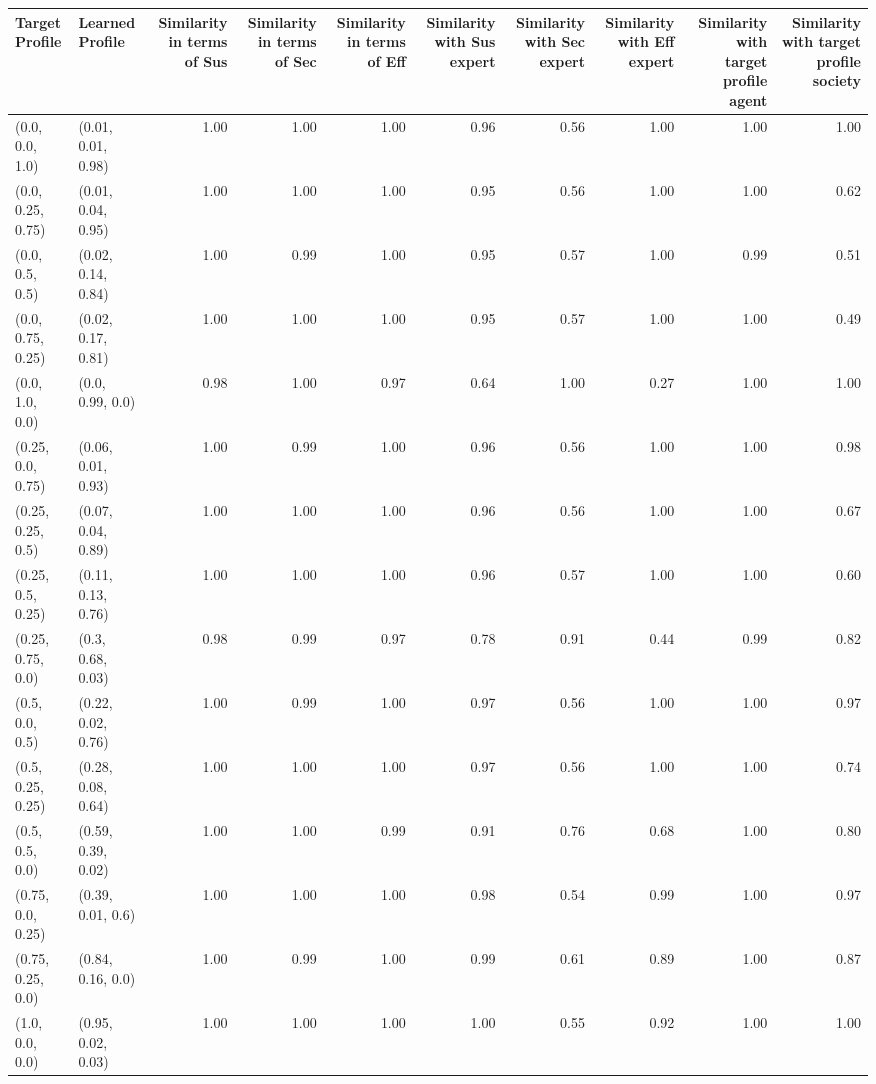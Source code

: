 \begin{tabular}{llrrrrrrrr}
\toprule
Target Profile & Learned Profile & Similarity in terms of Sus & Similarity in terms of Sec & Similarity in terms of Eff & Similarity with Sus expert & Similarity with Sec expert & Similarity with Eff expert & Similarity with target profile agent & Similarity with target profile society \\
\midrule
(0.0, 0.0, 1.0) & (0.01, 0.01, 0.98) & 1.00 & 1.00 & 1.00 & 0.96 & 0.56 & 1.00 & 1.00 & 1.00 \\
(0.0, 0.25, 0.75) & (0.01, 0.04, 0.95) & 1.00 & 1.00 & 1.00 & 0.95 & 0.56 & 1.00 & 1.00 & 0.62 \\
(0.0, 0.5, 0.5) & (0.02, 0.14, 0.84) & 1.00 & 0.99 & 1.00 & 0.95 & 0.57 & 1.00 & 0.99 & 0.51 \\
(0.0, 0.75, 0.25) & (0.02, 0.17, 0.81) & 1.00 & 1.00 & 1.00 & 0.95 & 0.57 & 1.00 & 1.00 & 0.49 \\
(0.0, 1.0, 0.0) & (0.0, 0.99, 0.0) & 0.98 & 1.00 & 0.97 & 0.64 & 1.00 & 0.27 & 1.00 & 1.00 \\
(0.25, 0.0, 0.75) & (0.06, 0.01, 0.93) & 1.00 & 0.99 & 1.00 & 0.96 & 0.56 & 1.00 & 1.00 & 0.98 \\
(0.25, 0.25, 0.5) & (0.07, 0.04, 0.89) & 1.00 & 1.00 & 1.00 & 0.96 & 0.56 & 1.00 & 1.00 & 0.67 \\
(0.25, 0.5, 0.25) & (0.11, 0.13, 0.76) & 1.00 & 1.00 & 1.00 & 0.96 & 0.57 & 1.00 & 1.00 & 0.60 \\
(0.25, 0.75, 0.0) & (0.3, 0.68, 0.03) & 0.98 & 0.99 & 0.97 & 0.78 & 0.91 & 0.44 & 0.99 & 0.82 \\
(0.5, 0.0, 0.5) & (0.22, 0.02, 0.76) & 1.00 & 0.99 & 1.00 & 0.97 & 0.56 & 1.00 & 1.00 & 0.97 \\
(0.5, 0.25, 0.25) & (0.28, 0.08, 0.64) & 1.00 & 1.00 & 1.00 & 0.97 & 0.56 & 1.00 & 1.00 & 0.74 \\
(0.5, 0.5, 0.0) & (0.59, 0.39, 0.02) & 1.00 & 1.00 & 0.99 & 0.91 & 0.76 & 0.68 & 1.00 & 0.80 \\
(0.75, 0.0, 0.25) & (0.39, 0.01, 0.6) & 1.00 & 1.00 & 1.00 & 0.98 & 0.54 & 0.99 & 1.00 & 0.97 \\
(0.75, 0.25, 0.0) & (0.84, 0.16, 0.0) & 1.00 & 0.99 & 1.00 & 0.99 & 0.61 & 0.89 & 1.00 & 0.87 \\
(1.0, 0.0, 0.0) & (0.95, 0.02, 0.03) & 1.00 & 1.00 & 1.00 & 1.00 & 0.55 & 0.92 & 1.00 & 1.00 \\
\bottomrule
\end{tabular}
